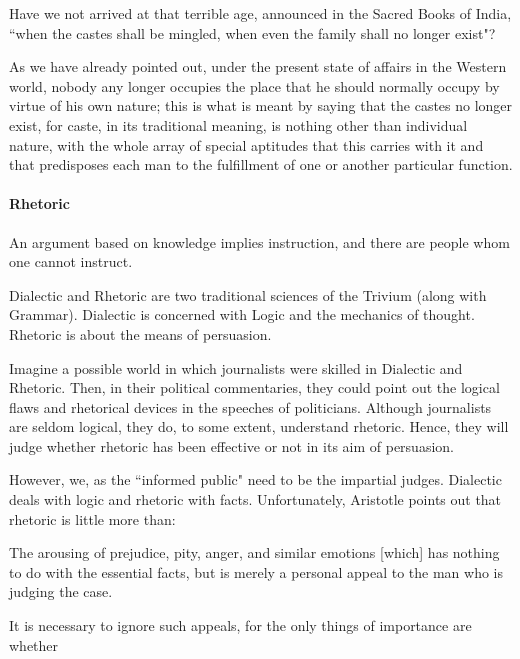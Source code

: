 \begin{quotex}
Have we not arrived at that terrible age, announced in the Sacred Books of India, ``when the castes shall be mingled, when even the family shall no longer exist"?

As we have already pointed out, under the present state of affairs in the Western world, nobody any longer occupies the place that he should normally occupy by virtue of his own nature; this is what is meant by saying that the castes no longer exist, for caste, in its traditional meaning, is nothing other than individual nature, with the whole array of special aptitudes that this carries with it and that predisposes each man to the fulfillment of one or another particular function. 

\end{quotex}
\paragraph{Rhetoric}
\begin{quotex}
An argument based on knowledge implies instruction, and there are people whom one cannot instruct. 

\end{quotex}
Dialectic and Rhetoric are two traditional sciences of the Trivium (along with Grammar). Dialectic is concerned with Logic and the mechanics of thought. Rhetoric is about the means of persuasion.

Imagine a possible world in which journalists were skilled in Dialectic and Rhetoric. Then, in their political commentaries, they could point out the logical flaws and rhetorical devices in the speeches of politicians. Although journalists are seldom logical, they do, to some extent, understand rhetoric. Hence, they will judge whether rhetoric has been effective or not in its aim of persuasion.

However, we, as the ``informed public" need to be the impartial judges. Dialectic deals with logic and rhetoric with facts. Unfortunately, Aristotle points out that rhetoric is little more than:

\begin{quotex}
The arousing of prejudice, pity, anger, and similar emotions [which] has nothing to do with the essential facts, but is merely a personal appeal to the man who is judging the case. 

\end{quotex}
It is necessary to ignore such appeals, for the only things of importance are whether

